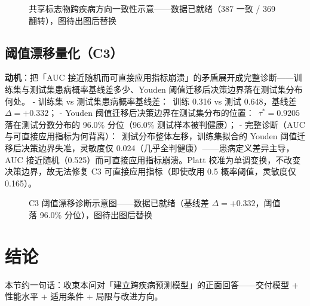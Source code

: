 \documentclass{internal-report}
\begin{document}
\begin{figure}[ht]
\centering
\caption{共享标志物跨疾病方向一致性示意——数据已就绪（387 一致 / 369 翻转），图待出图后替换}
\label{fig:migration-direction}
\end{figure}

\subsection{阈值漂移量化（C3）}
\textbf{动机}：把「AUC 接近随机而可直接应用指标崩溃」的矛盾展开成完整诊断——训练集与测试集患病概率基线差多少、Youden 阈值迁移后决策边界落在测试集分布何处。
- 训练集 vs 测试集患病概率基线差：\ 训练 0.316 vs 测试 0.648，基线差 $\Delta=+0.332$；
- Youden 阈值迁移后决策边界在测试集分布的位置：\ $\tau^*=0.9205$ 落在测试分数分布的 96.0\% 分位（96.0\% 测试样本被判健康）；
- 完整诊断（AUC 与可直接应用指标为何背离）：\ 测试分布整体左移，训练集拟合的 Youden 阈值迁移后决策边界失准，灵敏度仅 0.024（几乎全判健康）——患病定义差异主导，AUC 接近随机（0.525）而可直接应用指标崩溃。Platt 校准为单调变换，不改变决策边界，故无法修复 C3 可直接应用指标（即使改用 0.5 概率阈值，灵敏度仅 0.165）。

\begin{figure}[ht]
\centering
\caption{C3 阈值漂移诊断示意图——数据已就绪（基线差 $\Delta=+0.332$，阈值落 96.0\% 分位），图待出图后替换}
\label{fig:threshold-drift}
\end{figure}


\section{结论}

本节约一句话：收束本问对「建立跨疾病预测模型」的正面回答——交付模型 + 性能水平 + 适用条件 + 局限与改进方向。
\end{document}
